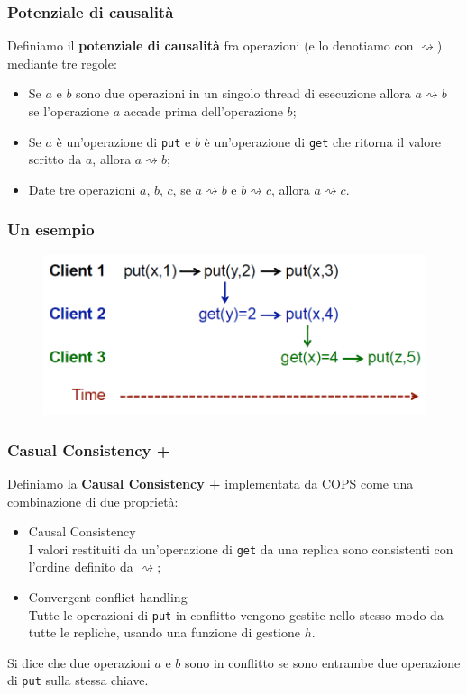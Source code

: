 \begin{frame}
\frametitle{Potenziale di causalità}
	\begin{definizione}
	Definiamo il \textbf{potenziale di causalità} fra operazioni (e lo denotiamo con $\rightsquigarrow$)
	mediante tre regole:
	\begin{itemize}
		\item<1-> Se $a$ e $b$ sono due operazioni in un singolo thread di esecuzione
				  allora $a \rightsquigarrow b$ se l'operazione $a$ accade prima dell'operazione $b$;
		\item<2-> Se $a$ è un'operazione di \texttt{put} e $b$ è un'operazione di
				  \texttt{get} che ritorna il valore scritto da $a$, allora $a \rightsquigarrow b$;
		\item<3-> Date tre operazioni $a$, $b$, $c$, se $a \rightsquigarrow b$ e $b 
				  \rightsquigarrow c$, allora $a \rightsquigarrow c$.
	\end{itemize}
	\end{definizione}
\end{frame}

\begin{frame}
\frametitle{Un esempio}
	\begin{figure}
		\centering
		\includegraphics[scale=0.40]{COPS/COPS2.png}
	\end{figure}
\end{frame}

\begin{frame}
\frametitle{Casual Consistency +}
\begin{definizione}
Definiamo la \textbf{Causal Consistency +} implementata da COPS come una combinazione di due proprietà:
	\begin{itemize}
		\item<1-> Causal Consistency \\
				  I valori restituiti da un'operazione di \texttt{get} da una replica sono 
				  consistenti con l'ordine definito da $\rightsquigarrow$;
		\item<2-> Convergent conflict handling \\
				  Tutte le operazioni di \texttt{put} in conflitto vengono gestite nello
				  stesso modo da tutte le repliche, usando una funzione di gestione $h$.
	\end{itemize}
\end{definizione}

\begin{definizione}
Si dice che due operazioni $a$ e $b$ sono in conflitto se sono entrambe
due operazione di \texttt{put} sulla stessa chiave.
\end{definizione}
\end{frame}

